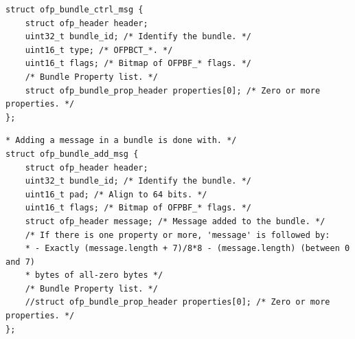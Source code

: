 \documentclass[conference]{sigcomm-alternate}
\newcommand{\cas}{CAS\xspace}
\begin{document}
\begin{appendix}
\begin{lstlisting}
struct ofp_bundle_ctrl_msg {
	struct ofp_header header;
	uint32_t bundle_id; /* Identify the bundle. */
	uint16_t type; /* OFPBCT_*. */
	uint16_t flags; /* Bitmap of OFPBF_* flags. */
	/* Bundle Property list. */
	struct ofp_bundle_prop_header properties[0]; /* Zero or more properties. */
};
\end{lstlisting}

\begin{lstlisting}
* Adding a message in a bundle is done with. */
struct ofp_bundle_add_msg {
	struct ofp_header header;
	uint32_t bundle_id; /* Identify the bundle. */
	uint16_t pad; /* Align to 64 bits. */
	uint16_t flags; /* Bitmap of OFPBF_* flags. */
	struct ofp_header message; /* Message added to the bundle. */
	/* If there is one property or more, 'message' is followed by:
	* - Exactly (message.length + 7)/8*8 - (message.length) (between 0 and 7)
	* bytes of all-zero bytes */
	/* Bundle Property list. */
	//struct ofp_bundle_prop_header properties[0]; /* Zero or more properties. */
};
\end{lstlisting}

\end{appendix}
\end{document}
